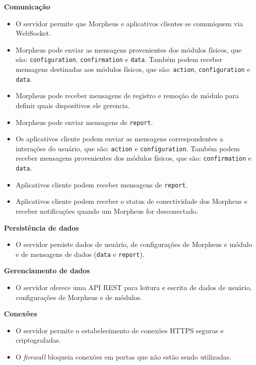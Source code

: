 \begin{description}

\item \textbf{Comunicação}

\begin{itemize}
\item O servidor permite que Morpheus e aplicativos clientes se comuniquem via WebSocket.
\item Morpheus pode enviar as mensagens provenientes dos módulos físicos, que são: \texttt{configuration}, \texttt{confirmation} e \texttt{data}. Também podem receber mensagens destinadas aos módulos físicos, que são: \texttt{action}, \texttt{configuration} e \texttt{data}.
\item Morpheus pode receber mensagens de registro e remoção de módulo para definir quais dispositivos ele gerencia.
\item Morpheus pode enviar mensagens de \texttt{report}.
\item Os aplicativos cliente podem enviar as mensagens correspondentes a interações do usuário, que são: \texttt{action} e \texttt{configuration}. Também podem receber mensagens provenientes dos módulos físicos, que são: \texttt{confirmation} e \texttt{data}.
\item Aplicativos cliente podem receber mensagens de \texttt{report}.
\item Aplicativos cliente podem receber o status de conectividade dos Morpheus e receber notificações quando um Morpheus for desconectado.
\end{itemize}

\item \textbf{Persistência de dados}

\begin{itemize}
\item O servidor persiste dados de usuário, de configurações de Morpheus e módulo e de mensagens de dados (\texttt{data} e \texttt{report}).
\end{itemize}

\item \textbf{Gerenciamento de dados}

\begin{itemize}
\item O servidor oferece uma API REST para leitura e escrita de dados de usuário, configurações de Morpheus e de módulos.
\end{itemize}

\item \textbf{Conexões}

\begin{itemize}
\item O servidor permite o estabelecimento de conexões HTTPS seguras e criptografadas.
\item O \emph{firewall} bloqueia conexões em portas que não estão sendo utilizadas.
\end{itemize}

\end{description}

